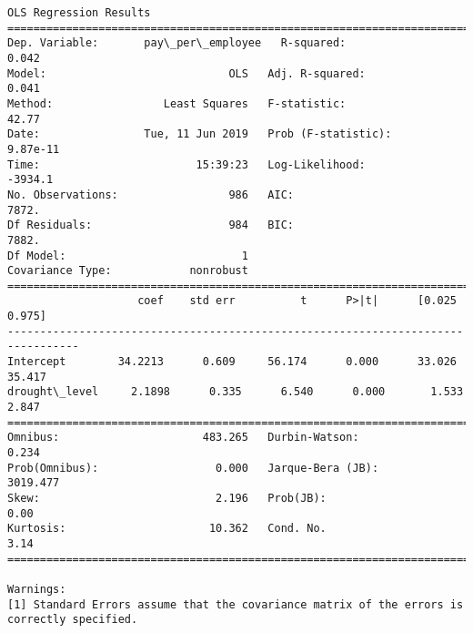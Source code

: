 \documentclass[11pt]{article}
\begin{document}
    \begin{Verbatim}[commandchars=\\\{\}]
                            OLS Regression Results                            
==============================================================================
Dep. Variable:       pay\_per\_employee   R-squared:                       0.042
Model:                            OLS   Adj. R-squared:                  0.041
Method:                 Least Squares   F-statistic:                     42.77
Date:                Tue, 11 Jun 2019   Prob (F-statistic):           9.87e-11
Time:                        15:39:23   Log-Likelihood:                -3934.1
No. Observations:                 986   AIC:                             7872.
Df Residuals:                     984   BIC:                             7882.
Df Model:                           1                                         
Covariance Type:            nonrobust                                         
=================================================================================
                    coef    std err          t      P>|t|      [0.025      0.975]
---------------------------------------------------------------------------------
Intercept        34.2213      0.609     56.174      0.000      33.026      35.417
drought\_level     2.1898      0.335      6.540      0.000       1.533       2.847
==============================================================================
Omnibus:                      483.265   Durbin-Watson:                   0.234
Prob(Omnibus):                  0.000   Jarque-Bera (JB):             3019.477
Skew:                           2.196   Prob(JB):                         0.00
Kurtosis:                      10.362   Cond. No.                         3.14
==============================================================================

Warnings:
[1] Standard Errors assume that the covariance matrix of the errors is correctly specified.

    \end{Verbatim}
\end{document}
